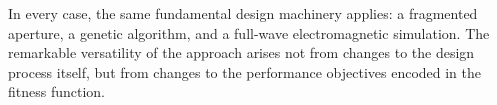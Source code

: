 In every case, the same fundamental design machinery applies: a fragmented aperture, a genetic algorithm, and a full-wave electromagnetic simulation.  The remarkable versatility of the approach arises not from changes to the design process itself, but from changes to the performance objectives encoded in the fitness function.

\FloatBarrier




